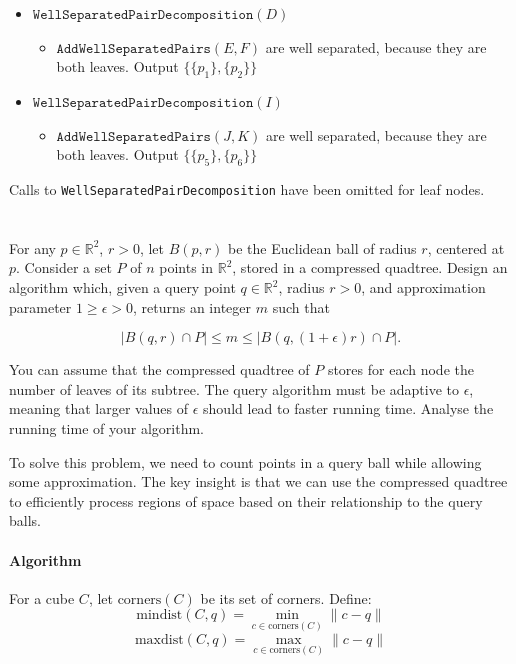 \documentclass{article}
\begin{document}
\begin{itemize}
    \item $\texttt{WellSeparatedPairDecomposition}(D)$
    \begin{itemize}
      \item $\texttt{AddWellSeparatedPairs}(E, F)$ are well separated, because they are both leaves. Output $\{\{p_1\}, \{p_2\}\}$
    \end{itemize}
    \item $\texttt{WellSeparatedPairDecomposition}(I)$
    \begin{itemize}
      \item $\texttt{AddWellSeparatedPairs}(J, K)$ are well separated, because they are both leaves. Output $\{\{p_5\}, \{p_6\}\}$
    \end{itemize}
  \end{itemize}
  Calls to \texttt{WellSeparatedPairDecomposition} have been omitted for leaf nodes.

  \newpage
  \section{}
  \begin{centerframebox}
    For any $p \in \mathbb{R}^2$, $r > 0$, let $B(p, r)$ be the Euclidean ball of radius $r$, centered at $p$. Consider a set $P$ of $n$ points in $\mathbb{R}^2$, stored in a compressed quadtree. Design an algorithm which, given a query point $q \in \mathbb{R}^2$, radius $r > 0$, and approximation parameter $1 \geq \epsilon > 0$, returns an integer $m$ such that

\[
|B(q, r) \cap P | \leq m \leq |B(q, (1 + \epsilon)r) \cap P |.
\]

You can assume that the compressed quadtree of $P$ stores for each node the number of leaves of its subtree. The query algorithm must be adaptive to $\epsilon$, meaning that larger values of $\epsilon$ should lead to faster running time. Analyse the running time of your algorithm.
  \end{centerframebox}

  To solve this problem, we need to count points in a query ball while allowing some approximation. The key insight is that we can use the compressed quadtree to efficiently process regions of space based on their relationship to the query balls.

\paragraph{Algorithm} For a cube $C$, let $\text{corners}(C)$ be its set of corners. Define:
\[
\text{mindist}(C,q) = \min_{c \in \text{corners}(C)} \|c-q\|
\]
\[
\text{maxdist}(C,q) = \max_{c \in \text{corners}(C)} \|c-q\|
\]
\end{document}
